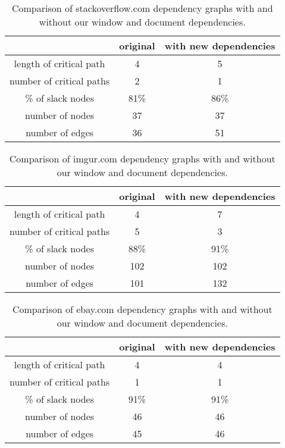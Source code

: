 \begin{table*}[tb]
\centering
\small
\begin{tabular}{|c|c|c|}
\hline
 & original & with new dependencies \\
\hline
length of critical path & 4 & 5 \\
number of critical paths & 2 & 1 \\
\% of slack nodes & 81\% & 86\% \\
number of nodes & 37 & 37 \\
number of edges & 36 & 51 \\
\hline
\end{tabular}\caption{Comparison of stackoverflow.com dependency graphs with and without our window and document dependencies.}
\label{t:stackoverflowgraph}
\end{table*}

\begin{table*}[tb]
\centering
\small
\begin{tabular}{|c|c|c|}
\hline
 & original & with new dependencies \\
\hline
length of critical path & 4 & 7 \\
number of critical paths & 5 & 3 \\
\% of slack nodes & 88\% & 91\% \\
number of nodes & 102 & 102 \\
number of edges & 101 & 132 \\
\hline
\end{tabular}\caption{Comparison of imgur.com dependency graphs with and without our window and document dependencies.}
\label{t:imgurgraph}
\end{table*}

\begin{table*}[tb]
\centering
\small
\begin{tabular}{|c|c|c|}
\hline
 & original & with new dependencies \\
\hline
length of critical path & 4 & 4 \\
number of critical paths & 1 & 1 \\
\% of slack nodes & 91\% & 91\% \\
number of nodes & 46 & 46 \\
number of edges & 45 & 46 \\
\hline
\end{tabular}\caption{Comparison of ebay.com dependency graphs with and without our window and document dependencies.}
\label{t:ebaygraph}
\end{table*}
